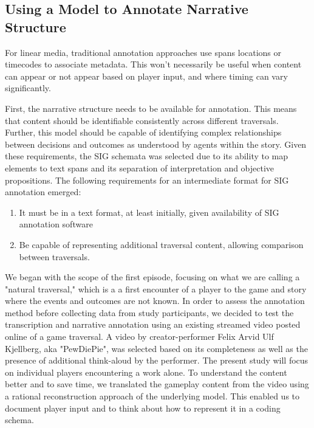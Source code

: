 \subsection{Using a Model to Annotate Narrative Structure}
\label{sec:orgheadline5}
For linear media, traditional annotation approaches use spans
locations or timecodes to associate metadata. This won't necessarily
be useful when content can appear or not appear based on player input,
and where timing can vary significantly.

First, the narrative structure needs to be available for
annotation. This means that content should be identifiable
consistently across different traversals. Further, this model should
be capable of identifying complex relationships between decisions and
outcomes as understood by agents within the story. Given these
requirements, the SIG schemata was selected due to its ability to map
elements to text spans and its separation of interpretation and
objective propositions. The following requirements for an intermediate
format for SIG annotation emerged:

\begin{enumerate}
\item It must be in a text format, at least initially, given
availability of SIG annotation software
\item Be capable of representing additional traversal content, allowing
comparison between traversals.
\end{enumerate}

We began with the scope of the first episode, focusing on what we are
calling a "natural traversal," which is a a first encounter of a
player to the game and story where the events and outcomes are not
known. In order to assess the annotation method before collecting data
from study participants, we decided to test the transcription and
narrative annotation using an existing streamed video posted online of
a game traversal. A video by creator-performer Felix Arvid Ulf
Kjellberg, aka "PewDiePie", was selected \cite{Kjellberg2013-fn} based
on its completeness as well as the presence of additional think-aloud
by the performer. The present study will focus on individual players
encountering a work alone. To understand the content better and to
save time, we translated the gameplay content from the video using a
rational reconstruction approach of the underlying model. This enabled
us to document player input and to think about how to represent it in
a coding schema.

